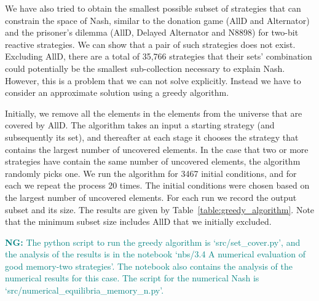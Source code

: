 \documentclass{article}
\theoremstyle{definition}
\newcommand{\nikoleta}[1]{\textcolor{teal}{{\bf NG:} #1}}
\begin{document}
We have also tried to obtain the smallest possible subset of strategies that can
constrain the space of Nash, similar to the donation game (AllD and Alternator)
and the prisoner's dilemma (AllD, Delayed Alternator and N8898) for two-bit
reactive strategies. We can show that a pair of such strategies does not exist.
Excluding AllD, there are a total of 35,766 strategies that their sets'
combination could potentially  be the smallest sub-collection necessary to
explain Nash. However, this is a problem that we can not solve explicitly.
Instead we have to consider an approximate solution using a greedy algorithm.

Initially, we remove all the elements in the elements from the universe that are
covered by AllD. The algorithm takes an input a starting strategy (and
subsequently its set), and thereafter at each stage it chooses the strategy that
contains the largest number of uncovered elements. In the case that two or more
strategies have contain the same number of uncovered elements, the algorithm
randomly picks one. We run the algorithm for 3467 initial conditions, and for
each we repeat the process 20 times. The initial conditions were chosen based on
the largest number of uncovered elements. For each run we record the output
subset and its size. The results are given by
Table~\ref{table:greedy_algorithm}. Note that the minimum subset size includes
AllD that we initially excluded.

\begin{table}[htbp]
  \centering
\caption{\textbf{Results of greedy algorithm.} The greedy algorithm was used to
find the smallest possible subset of pure memory-two strategies that can
constrain the space of Nash in the case of memory-two strategies. Based on the
approximate solution, the smallest subset is of size
11.}\label{table:greedy_algorithm}
\end{table}

\nikoleta{The python script to run the greedy algorithm is `src/set\_cover.py',
and the analysis of the results is in the
notebook `nbs/3.4 A numerical evaluation of good memory-two strategies'.
The notebook also contains the analysis of the numerical results for this case.
The script for the numerical Nash is `src/numerical\_equilibria\_memory\_n.py'.}
\end{document}
